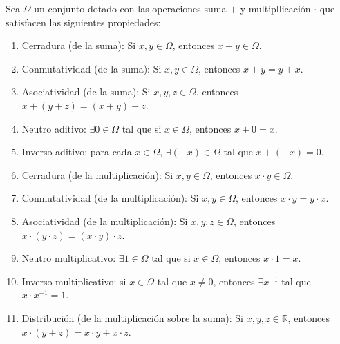 \documentclass[11pt]{article}
\newcommand{\R}{\mathbb{R}}
\newcommand{\defined}{\coloneqq}
\let\set\Set
\begin{document}
%

Sea $\Omega$ un conjunto dotado con las operaciones suma $+$ y multipllicación $\cdot$ que satisfacen las siguientes propiedades:
\begin{enumerate}
\item Cerradura (de la suma): Si $x,y\in \Omega$, entonces $x+y\in \Omega$.
\item Conmutatividad (de la suma): Si $x,y\in \Omega$, entonces $x+y=y+x$.
\item Asociatividad (de la suma): Si $x,y,z \in \Omega$, entonces $x+(y+z)=(x+y)+z$.
\item Neutro aditivo: $\exists 0 \in \Omega$ tal que si $x\in \Omega$, entonces $x+0=x$.
\item Inverso aditivo: para cada $x\in \Omega$, $\exists (-x)\in \Omega$ tal que $x+(-x)=0$.
\item Cerradura (de la multiplicación): Si $x,y\in \Omega$, entonces $x\cdot y \in \Omega$.
\item Conmutatividad (de la multiplicación): Si $x,y\in \Omega$, entonces $x\cdot y = y\cdot x$.
\item Asociatividad (de la multiplicación): Si $x,y,z \in \Omega$, entonces $x\cdot (y\cdot z)=(x\cdot y)\cdot z$.
\item Neutro multiplicativo: $\exists 1\in \Omega$ tal que si $x\in \Omega$, entonces $x\cdot 1=x$.
\item Inverso multiplicativo: si $x\in \Omega$ tal que $x\neq 0$, entonces $\exists x^{-1}$ tal que $x\cdot x^{-1}=1$.
\item Distribución (de la multiplicación sobre la suma): Si $x,y,z\in \R$, entonces $x\cdot(y+z)=x\cdot y+x\cdot z$.
\end{enumerate}
\end{document}
